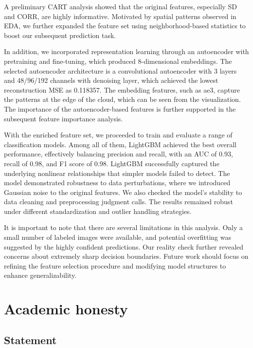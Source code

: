 \documentclass[10pt,letterpaper]{article}
\begin{document}
A preliminary CART analysis showed that the original features, especially SD and CORR, are highly informative. Motivated by spatial patterns observed in EDA, we further expanded the feature set using neighborhood-based statistics to boost our subsequent prediction task.

In addition, we incorporated representation learning through an autoencoder with pretraining and fine-tuning, which produced 8-dimensional embeddings. The selected autoencoder architecture is a convolutional autoencoder with 3 layers and 48/96/192 channels with denoising layer, which achieved the lowest reconstruction MSE as 0.118357. The embedding features, such as ae3, capture the patterns at the edge of the cloud, which can be seen from the visualization. The importance of the autoencoder-based features is further supported in the subsequent feature importance analysis.

 With the enriched feature set, we proceeded to train and evaluate a range of classification models. Among all of them, LightGBM achieved the best overall performance, effectively balancing precision and recall, with an AUC of 0.93, recall of 0.98, and F1 score of 0.98. LightGBM successfully captured the underlying nonlinear relationships that simpler models failed to detect. The model demonstrated robustness to data perturbations, where we introduced Gaussian noise to the original features. We also checked the model's stability to data cleaning and preprocessing judgment calls. The results remained robust under different standardization and outlier handling strategies.

It is important to note that there are several limitations in this analysis. Only a small number of labeled images were available, and potential overfitting was suggested by the highly confident predictions. Our reality check further revealed concerns about extremely sharp decision boundaries. Future work should focus on refining the feature selection procedure and modifying model structures to enhance generalizability.


\newpage
\nocite{*}


\newpage
\appendix
\section{Academic honesty}
\subsection{Statement}
\end{document}

